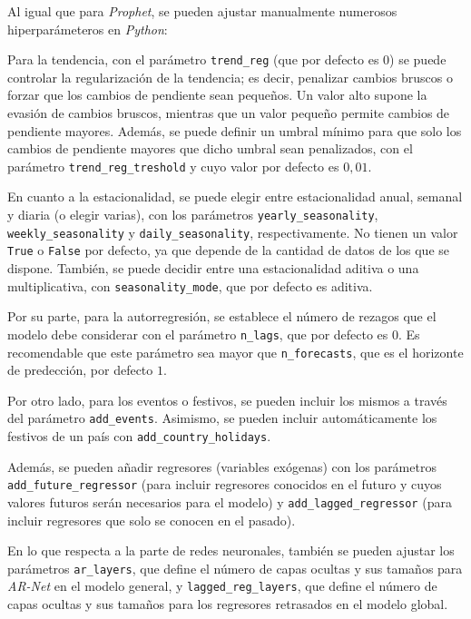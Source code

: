 \documentclass[12pt,twoside]{article}
\begin{document}
Al igual que para \textit{Prophet}, se pueden ajustar manualmente numerosos hiperparámeteros \cite{np2} en \textit{Python}:

Para la tendencia, con el parámetro \texttt{trend\_reg} (que por defecto es $0$) se puede controlar la regularización de la tendencia; es decir, penalizar cambios bruscos o forzar que los cambios de pendiente sean pequeños. Un valor alto supone la evasión de cambios bruscos, mientras que un valor pequeño permite cambios de pendiente mayores. Además, se puede definir un umbral mínimo para que solo los cambios de pendiente mayores que dicho umbral sean penalizados, con el parámetro \texttt{trend\_reg\_treshold} y cuyo valor por defecto es $0,01$.

En cuanto a la estacionalidad, se puede elegir entre estacionalidad anual, semanal y diaria (o elegir varias), con los parámetros \texttt{yearly\_seasonality}, \texttt{weekly\_seasonality} y \texttt{daily\_seasonality}, respectivamente. No tienen un valor \texttt{True} o \texttt{False} por defecto, ya que depende de la cantidad de datos de los que se dispone. También, se puede decidir entre una estacionalidad aditiva o una multiplicativa, con \texttt{seasonality\_mode}, que por defecto es aditiva.

Por su parte, para la autorregresión, se establece el número de rezagos que el modelo debe considerar con el parámetro \texttt{n\_lags}, que por defecto es $0$. Es recomendable que este parámetro sea mayor que \texttt{n\_forecasts}, que es el horizonte de predección, por defecto $1$.

Por otro lado, para los eventos o festivos, se pueden incluir los mismos a través del parámetro \texttt{add\_events}. Asimismo, se pueden incluir automáticamente los festivos de un país con \texttt{add\_country\_holidays}.

Además, se pueden añadir regresores (variables exógenas) con los parámetros 
\newline
\texttt{add\_future\_regressor} (para incluir regresores conocidos en el futuro y cuyos valores futuros serán necesarios para el modelo) y \texttt{add\_lagged\_regressor} (para incluir regresores que solo se conocen en el pasado).

En lo que respecta a la parte de redes neuronales, también se pueden ajustar los parámetros \texttt{ar\_layers}, que define el número de capas ocultas y sus tamaños para \textit{AR-Net} en el modelo general, y \texttt{lagged\_reg\_layers}, que define el número de capas ocultas y sus tamaños para los regresores retrasados en el modelo global.
\end{document}
